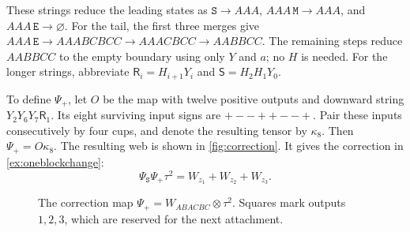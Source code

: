 \documentclass[a4paper,11pt]{amsart}
\newcommand{\wordstart}{\mathtt{S}}
\newcommand{\wordmiddle}{\mathtt{M}}
\newcommand{\wordend}{\mathtt{E}}
\newcommand{\startmap}{{\Psi}_{{\wordstart}}}
\newcommand{\createmap}{{\Psi}_+}
\numberwithin{equation}{subsection}
\theoremstyle{plain}
\theoremstyle{definition}
\theoremstyle{remark}
\begin{document}
These strings reduce the leading states as
$\wordstart\to AAA$, $AAA\,\wordmiddle\to AAA$, and $AAA\,\wordend\to\varnothing$.
For the tail, the first three merges give
$AAA\,\wordend\to AAABCBCC\to AAACBCC\to AABBCC$.
The remaining steps reduce $AABBCC$ to the empty boundary using only
$Y$ and $a$; no $H$ is needed.
For the longer strings, abbreviate
$\mathsf R_i=H_{i+1}Y_i$ and $\mathsf S=H_2H_1Y_0$.

To define $\createmap$, let $O$ be the map with twelve positive outputs and
downward string $Y_2Y_6Y_7\mathsf R_1$. Its eight surviving input
signs are $+--++--+$. Pair these inputs consecutively by four cups,
and denote the resulting tensor by $\kappa_8$. Then $\createmap=O\kappa_8$.
The resulting web is shown in \autoref{fig:correction}.
It gives the correction in \autoref{ex:oneblockchange}:
\[
\startmap\createmap\tau^2=W_{z_1}+W_{z_2}+W_{z_3}.
\]

\begin{figure}[ht]
\centering
{}
\caption{The correction map
$\createmap=W_{ABACBC}\otimes\tau^2$.
Squares mark outputs $1,2,3$, which are reserved for the next attachment.}
\label{fig:correction}
\end{figure}
\end{document}
